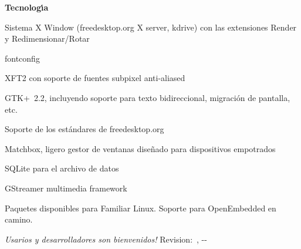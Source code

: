 {\smallskip
\textbf{Tecnolog{\'\i}a}
\begin{compactitem}
   \item Sistema X Window {\texttrademark}{} (freedesktop.org X
     server, kdrive) con las extensiones Render y
     Redimensionar/Rotar
   \item fontconfig
   \item XFT2 con soporte de fuentes subpixel anti-aliased
   \item GTK+~2.2, incluyendo soporte para texto bidireccional, migraci{\'o}n de pantalla,
     etc.
   \item Soporte de los est{\'a}ndares de freedesktop.org
   \item Matchbox, ligero gestor de ventanas dise{\~n}ado para dispositivos
     empotrados
   \item SQLite para el archivo de datos
   \item GStreamer multimedia framework
   \item Paquetes disponibles para Familiar Linux. Soporte para OpenEmbedded
     en camino.
\end{compactitem}

\smallskip
\textit{{\textexclamdown}Usarios y desarrolladores son bienvenidos!}%
\hfill\tiny{Revision:~\rcsInfoRevision, \rcsInfoYear-\rcsInfoMonth-\rcsInfoDay}
}

